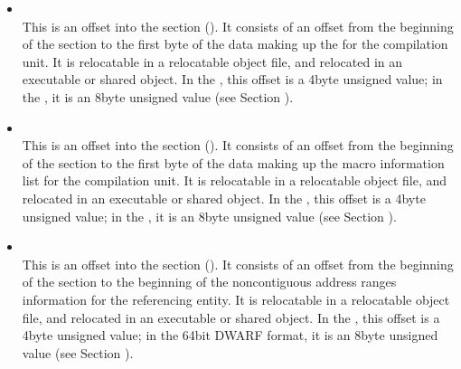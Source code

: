 \begin{itemize}
\item {} \\
This is an offset into the 
\dotdebugloc{}
section
(). 
It consists of an offset from the
beginning of the 
\dotdebugloc{}
section to the first byte of
the data making up the 
 for the compilation unit. 
It is relocatable in a relocatable object file, and
relocated in an executable or shared object. In the 
\thirtytwobitdwarfformat, this offset is a 4\dash byte unsigned value;
in the \sixtyfourbitdwarfformat, it is an 8\dash byte unsigned value
(see Section ).


\item {} \\
This is an 
offset into the 
\dotdebugmacinfo{} section
(). 
It consists of an offset from the
beginning of the \dotdebugmacinfo{} 
section to the first byte of
the data making up the macro information list for the compilation
unit. 
It is relocatable in a relocatable object file, and
relocated in an executable or shared object. In the 
\thirtytwobitdwarfformat, this offset is a 4\dash byte unsigned value;
in the \sixtyfourbitdwarfformat, it is an 8\dash byte unsigned value
(see Section ).

\item {} \\
This is an 
offset into the \dotdebugranges{} section
(). 
It consists of an
offset from the beginning of the 
\dotdebugranges{} section
to the beginning of the non\dash contiguous address ranges
information for the referencing entity.  
It is relocatable in
a relocatable object file, and relocated in an executable or
shared object. In the \thirtytwobitdwarfformat, this offset
is a 4\dash byte unsigned value; in the 64\dash bit DWARF
format, it is an 8\dash byte unsigned value (see Section
).
\end{itemize}

